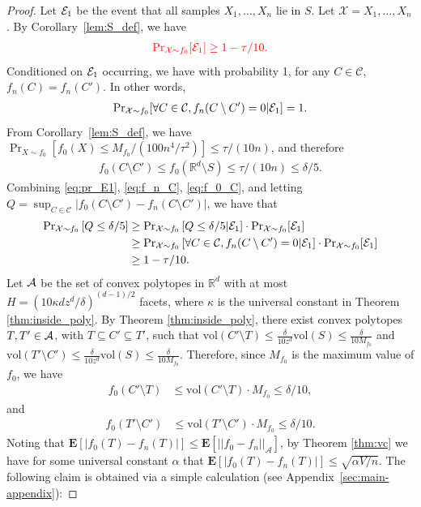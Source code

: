 \documentclass[final,12pt]{colt2018}
\newcommand{\nnew}[1]{{\color{red} #1}}
\newcommand{\nnew}[1]{#1}
\newtheorem{informal theorem}[theorem]{Theorem (informal statement)}
\newcommand{\E}{\mathbf{E}}
\newcommand{\vol}{\mathrm{vol}}
\begin{document}
\begin{proof}
Let ${\cal E}_1$ be the event that all samples  {$X_1,\ldots,X_n$} lie in $S$.
\nnew{Let $\mathcal{X} = X_1,\ldots,X_n$.}
By Corollary~\ref{lem:S_def}, we have
\begin{align}
\nnew{ {\Pr}_{\mathcal{X}\sim f_0}[{\cal E}_1] 
\geq 1-\tau/10. } \label{eq:pr_E1}
\end{align}
Conditioned on ${\cal E}_1$ occurring, \nnew{we have with probability 1, for any $C \in \mathcal{C}$, $f_n(C)=f_n(C')$.
In other words,
\begin{align}
{\Pr}_{\mathcal{X}\sim f_0}[\forall C \in \mathcal{C}, f_n(C \setminus C')=0 | {\cal E}_1] = 1. \label{eq:f_n_C}
\end{align}
}
From Corollary~\ref{lem:S_def}, we have ${\Pr}_{X\sim f_0}[f_0(X) \leq M_{f_0} / (100 n^4/\tau^2)] \leq \tau/(10n)$, and therefore
\begin{align}
f_0(C\setminus C') \leq f_0(\mathbb{R}^d\setminus S) \leq \tau/(10n) \leq \delta/5. \label{eq:f_0_C}
\end{align}
Combining \eqref{eq:pr_E1}, \eqref{eq:f_n_C}, \eqref{eq:f_0_C}, and letting 
$Q = \sup_{C \in \mathcal{C}} |f_0(C\setminus C') - f_n(C\setminus C')|$, we have that
\nnew{
\begin{align}
{\Pr}_{\mathcal{X}\sim f_0}\left[ Q \leq \delta/5\right] 
&\geq {\Pr}_{\mathcal{X}\sim f_0}\left[ Q \leq \delta/5 | {\cal E}_1 \right] \cdot {\Pr}_{\mathcal{X}\sim f_0}[{\cal E}_1] \notag \\
&\geq {\Pr}_{\mathcal{X}\sim f_0}\left[ \forall C \in \mathcal{C}, f_n(C\setminus C') = 0 | {\cal E}_1 \right] \cdot {\Pr}_{\mathcal{X}\sim f_0}[{\cal E}_1] \notag \\
 &\geq 1-\tau/10. \label{eq:prCCprime}
\end{align}
}
Let ${\cal A}$ be the set of convex polytopes in $\mathbb{R}^d$ 
with at most $H=(10 \kappa dz^{d}/\delta)^{(d-1)/2}$ facets, 
where $\kappa$ is the universal constant in Theorem \ref{thm:inside_poly}.
By Theorem \ref{thm:inside_poly}, there exist convex polytopes $T, T' \in {\cal A}$, 
with $T \subseteq C' \subseteq T'$, such that
$
\vol(C' \setminus T) 
\leq \frac{\delta}{10 z^d} \vol(S) 
\leq \frac{\delta}{10 M_{f_0}}
$
and
$
\vol(T'\setminus C') 
\leq \frac{\delta}{10 z^d} \vol(S) \leq 
\frac{\delta}{10 M_{f_0}}.
$
Therefore, since $M_{f_0}$ is the maximum value of $f_0$, we have
\begin{align}
f_0(C'\setminus T) &\leq \vol(C'\setminus T) \cdot M_{f_0} \leq \delta/10,  \label{eq:f0_Cp_T}
\end{align}
and
\begin{align}
f_0(T'\setminus C') &\leq \vol(T'\setminus C') \cdot M_{f_0} \leq \delta/10. \label{eq:f0_Tp_Cp}
\end{align}
 {Noting that $\E[|f_0(T)-f_n(T)|] \leq \E[||f_0 - f_n||_{\mathcal{A}}]$, by Theorem \ref{thm:vc} we have for some universal constant $\alpha$ that}
$
\E[|f_0(T)-f_n(T)|]
\leq  { \sqrt{ \alpha V / n } }
$.
The following claim is obtained via a simple calculation (see Appendix~\ref{sec:main-appendix}):


\end{proof}
\end{document}
